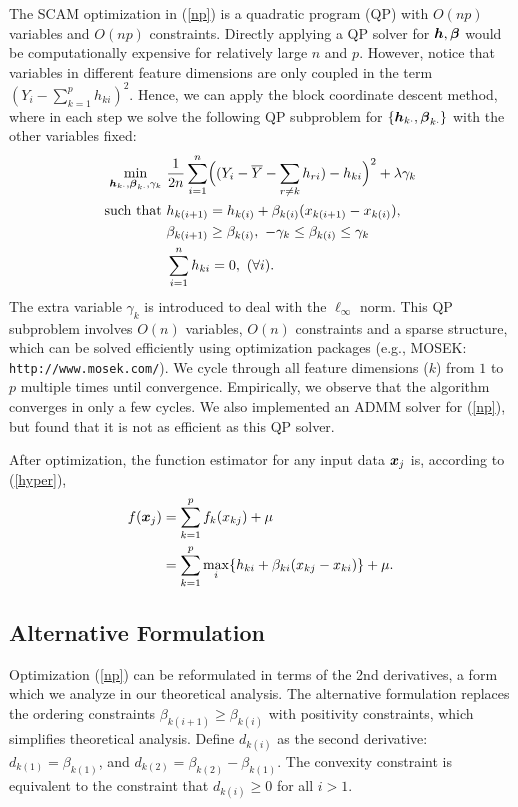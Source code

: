 The SCAM optimization in (\ref{np}) is a quadratic program (QP) with
$O(np)$ variables and $O(np)$ constraints. 
Directly applying a QP solver for $\boldsymbol{h},
\boldsymbol{\beta}$ would be computationally expensive for relatively large
$n$ and $p$. However, notice that variables in different feature
dimensions are only coupled in the term
$(Y_{i}-\sum_{k=1}^{p}h_{ki})^{2}$. Hence, we can apply the block
coordinate descent method, where in each step we solve the following
QP subproblem for $\{\boldsymbol{h}_{k\cdot},\boldsymbol{\beta}_{k\cdot}\}$ with the
other variables fixed:
\begin{equation}
\begin{split}\nonumber
       \min_{\bds{h}_{k\cdot},\bds{\beta}_{k\cdot},\gamma_{k}} &
             \ \frac{1}{2n}\sum_{i=1}^{n}\Bigl((Y_{i}-\bar{Y}-\sum_{r\neq{k}}h_{ri})-h_{ki}\Bigr)^{2} 
                      + \lambda\gamma_{k} \\
        \textrm{such that} & \ h_{k(i+1)} = h_{k(i)} + \beta_{k(i)}(x_{k(i+1)}-x_{k(i)}),\\
        &\ \beta_{k(i+1)} \geq \beta_{k(i)}, \ -\gamma_{k}\leq\beta_{k(i)}\leq\gamma_{k}\\
        &\  \sum_{i=1}^{n}h_{ki}=0, \ (\forall i).
\end{split}
\end{equation}
The extra variable $\gamma_{k}$ is introduced to deal with the $\ell_{\infty}$ norm. This QP subproblem involves $O(n)$ variables, $O(n)$ constraints and a sparse structure, 
which can be solved efficiently using optimization packages (e.g., MOSEK: \verb+http://www.mosek.com/+).  We cycle through all feature dimensions ($k$) from $1$ to $p$ multiple times until convergence.
Empirically, we observe that the algorithm converges in only a few cycles. We also implemented an ADMM solver for (\ref{np}), but found that it is not as efficient as this QP solver.

After optimization, the function estimator for any input data $\boldsymbol{x}_j$ is, according to (\ref{hyper}),
\begin{equation}
\begin{split}
\nonumber
      f(\boldsymbol{x}_j) & = \sum_{k=1}^{p}f_k(x_{kj})+\mu \\ 
    & = \sum_{k=1}^{p}\max_{i} \{h_{ki}+\beta_{ki}(x_{kj}-x_{ki})\} +
      \mu.
\end{split}
\end{equation} 


\subsection{Alternative Formulation}
Optimization (\ref{np}) can be reformulated in terms of the 2nd derivatives, a form which we analyze in our theoretical analysis. The alternative formulation replaces the ordering
constraints $\beta_{k(i+1)} \geq \beta_{k(i)}$ with positivity
constraints, which simplifies theoretical analysis.
Define $d_{k(i)}$ as the second derivative:
$d_{k(1)} = \beta_{k(1)}$, and $d_{k(2)} =
\beta_{k(2)} - \beta_{k(1)}$. The convexity constraint is
equivalent to the constraint that $d_{k(i)} \geq 0$ for all $i >
1$.

